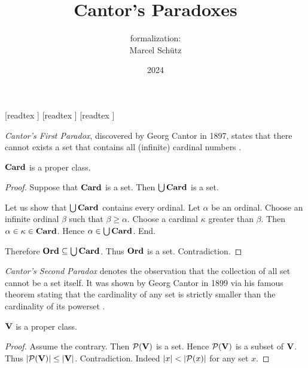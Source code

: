 \documentclass{article}
\title{Cantor's Paradoxes}
\author{\Naproche formalization: \vspace{0.5em} \\
Marcel Schütz}
\date{2024}
\begin{document}
  \maketitle

  \begin{imports}
    \begin{forthel}
      [readtex ]
      [readtex ]
      [readtex ]
    \end{forthel}
  \end{imports}

  \noindent \emph{Cantor's First Paradox}, discovered by Georg Cantor in 1897,
  states that there cannot exists a set that contains all (infinite) cardinal
  numbers \cite[chapter 156]{Cantor1991}.

  \begin{forthel}
    \begin{theorem*}\label{cantor_paradox_1}
      $\textbf{Card}$ is a proper class.
    \end{theorem*}
    \begin{proof}
      Suppose that $\textbf{Card}$ is a set.
      Then $\bigcup \textbf{Card}$ is a set.

      Let us show that $\bigcup \textbf{Card}$ contains every ordinal.
        Let $\alpha$ be an ordinal.
        Choose an infinite ordinal $\beta$ such that $\beta \geq \alpha$.
        Choose a cardinal $\kappa$ greater than $\beta$.
        Then $\alpha \in \kappa \in \textbf{Card}$.
        Hence $\alpha \in \bigcup \textbf{Card}$.
      End.

      Therefore $\textbf{Ord} \subseteq \bigcup \textbf{Card}$.
      Thus $\textbf{Ord}$ is a set.
      Contradiction.
    \end{proof}
  \end{forthel}

  \emph{Cantor's Second Paradox} denotes the observation that the collection of all set cannot be a set itself.
  It was shown by Georg Cantor in 1899 via his famous theorem stating that the
  cardinality of any set is strictly smaller than the cardinality of its 
  powerset \cite[chapter 163]{Cantor1991}.

  \begin{forthel}
    \begin{theorem*}\label{cantor_paradox_2}
      $\textbf{V}$ is a proper class.
    \end{theorem*}
    \begin{proof}
      Assume the contrary.
      Then $\mathcal{P}(\textbf{V})$ is a set.
      Hence $\mathcal{P}(\textbf{V})$ is a subset of $\textbf{V}$.
      Thus $|\mathcal{P}(\textbf{V})| \leq |\textbf{V}|$.
      Contradiction.
      Indeed $|x| < |\mathcal{P}(x)|$ for any set $x$.
    \end{proof}
  \end{forthel}
\end{document}
